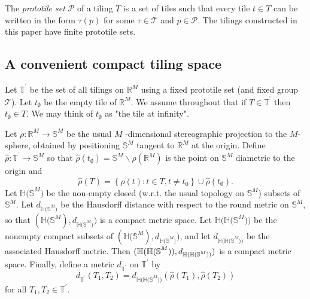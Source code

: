\documentclass{amsproc}
\theoremstyle{plain}
\theoremstyle{definition}
\numberwithin{equation}{section}
\begin{document}
The \textit{prototile set} $\mathcal{P}$ of a tiling $T$ is a set of tiles
such that every tile $t\in T$ can be written in the form $\tau(p)$ for some $%
\tau\in\mathcal{T}$ and $p\in\mathcal{P}$. The tilings constructed in this
paper have finite prototile sets.

\subsection{A convenient compact tiling space}

Let $\mathbb{T}^{^{\prime}}$ be the set of all tilings on $\mathbb{R}^{M}$
using a fixed prototile set (and fixed group $\mathcal{T}$). Let $%
t_{\emptyset}$ be the empty tile of $\mathbb{R}^{M}$. We assume throughout
that if $T\in\mathbb{T}^{^{\prime}}$ then $t_{\emptyset}\in T$. We may think
of $t_{\emptyset}$ as "the tile at infinity".

Let $\rho:\mathbb{R}^{M}\rightarrow\mathbb{S}^{M}$ be the usual $M$%
-dimensional stereographic projection to the $M$-sphere, obtained by
positioning $\mathbb{S}^{M}$ tangent to $\mathbb{R}^{M}$ at the origin.
Define $\widehat{\rho}:\mathbb{T}^{^{\prime}}\rightarrow\mathbb{S}^{M}$ so
that $\widehat{\rho}\left( t_{\emptyset}\right) =\mathbb{S}^{M}\backslash
\rho(\mathbb{R}^{M})$ is the point on $\mathbb{S}^{M}$ diametric to the
origin and%
\begin{equation*}
\widehat{\rho}\left( T\right) =\left\{ \rho\left( t\right) :t\in T,t\neq
t_{0}\right\} \cup\widehat{\rho}\left( t_{\emptyset}\right) \text{.}
\end{equation*}
Let $\mathbb{H(S}^{M})$ be the non-empty closed (w.r.t. the usual topology
on $\mathbb{S}^{M}$) subsets of $\mathbb{S}^{M}.$ Let $d_{\mathbb{H(S}^{M})}$
be the Hausdorff distance with respect to the round metric on $\mathbb{S}%
^{M} $, so that $(\mathbb{H(S}^{M}),d_{\mathbb{H(S}^{M})})$ is a compact
metric space. Let $\mathbb{H(H(S}^{M}))$ be the nonempty compact subsets of $%
(\mathbb{H(S}^{M}),d_{\mathbb{H(S}^{M})})$, and let $d_{\mathbb{H(H(S}%
^{M}))} $ be the associated Hausdorff metric. Then $(\mathbb{H(H(S}^{M})),d_{%
\mathbb{H(H(S}^{M}))})$ is a compact metric space. Finally, define a metric $%
d_{\mathbb{T}^{\prime}}$ on $\mathbb{T}^{\prime}$ by%
\begin{equation*}
d_{\mathbb{T}^{\prime}}(T_{1},T_{2})=d_{\mathbb{H(H(S}^{M}))}(\widehat{\rho }%
\left( T_{1}\right) ,\widehat{\rho}\left( T_{2}\right) )
\end{equation*}
for all $T_{1},T_{2}\in\mathbb{T}^{\prime}$.
\end{document}
